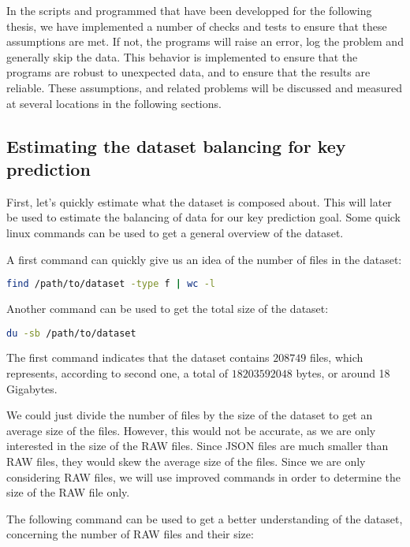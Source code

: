    In the scripts and programmed that have been developped for the following thesis, we have implemented a number of checks and tests to ensure that these assumptions are met. If not, the programs will raise an error, log the problem and generally skip the data. This behavior is implemented to ensure that the programs are robust to unexpected data, and to ensure that the results are reliable. These assumptions, and related problems will be discussed and measured at several locations in the following sections.

    \subsection{Estimating the dataset balancing for key prediction}
    First, let's quickly estimate what the dataset is composed about. This will later be used to estimate the balancing of data for our key prediction goal. Some quick linux commands can be used to get a general overview of the dataset.
    
    A first command can quickly give us an idea of the number of files in the dataset:
    \begin{lstlisting}[caption={Count all dataset files}, label=methods:code:count_all_dataset_files, language=bash]
        find /path/to/dataset -type f | wc -l
    \end{lstlisting}

    Another command can be used to get the total size of the dataset:
    \begin{lstlisting}[caption={Get the total size of the dataset}, label=methods:code:get_total_size_dataset, language=bash]
        du -sb /path/to/dataset
    \end{lstlisting}

    The first command indicates that the dataset contains $ 208749 $ files, which represents, according to second one, a total of $ 18203592048 $ bytes, or around 18 Gigabytes.

    We could just divide the number of files by the size of the dataset to get an average size of the files. However, this would not be accurate, as we are only interested in the size of the RAW files. Since JSON files are much smaller than RAW files, they would skew the average size of the files. Since we are only considering RAW files, we will use improved commands in order to determine the size of the RAW file only.

    The following command can be used to get a better understanding of the dataset, concerning the number of RAW files and their size:

